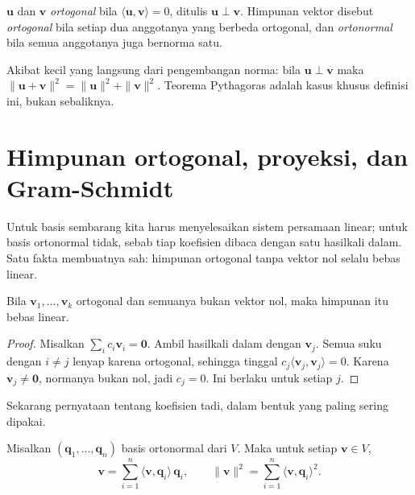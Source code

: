 
\begin{definisi}
$\mathbf{u}$ dan $\mathbf{v}$ \emph{ortogonal} bila
$\langle\mathbf{u},\mathbf{v}\rangle=0$, ditulis $\mathbf{u}\perp\mathbf{v}$. Himpunan
vektor disebut \emph{ortogonal} bila setiap dua anggotanya yang berbeda ortogonal, dan
\emph{ortonormal} bila semua anggotanya juga bernorma satu.
\end{definisi}

Akibat kecil yang langsung dari pengembangan norma: bila $\mathbf{u}\perp\mathbf{v}$
maka $\|\mathbf{u}+\mathbf{v}\|^{2}=\|\mathbf{u}\|^{2}+\|\mathbf{v}\|^{2}$. Teorema
Pythagoras adalah kasus khusus definisi ini, bukan sebaliknya.

\section{Himpunan ortogonal, proyeksi, dan Gram-Schmidt}

Untuk basis sembarang kita harus menyelesaikan sistem persamaan linear; untuk basis
ortonormal tidak, sebab tiap koefisien dibaca dengan satu hasilkali dalam. Satu fakta
membuatnya sah: himpunan ortogonal tanpa vektor nol selalu bebas linear.

\begin{lemma}
Bila $\mathbf{v}_{1},\dots,\mathbf{v}_{k}$ ortogonal dan semuanya bukan vektor nol,
maka himpunan itu bebas linear.
\end{lemma}

\begin{proof}
Misalkan $\sum_{i}c_{i}\mathbf{v}_{i}=\mathbf{0}$. Ambil hasilkali dalam dengan
$\mathbf{v}_{j}$. Semua suku dengan $i\ne j$ lenyap karena ortogonal, sehingga tinggal
$c_{j}\langle\mathbf{v}_{j},\mathbf{v}_{j}\rangle=0$. Karena $\mathbf{v}_{j}\ne\mathbf{0}$,
normanya bukan nol, jadi $c_{j}=0$. Ini berlaku untuk setiap $j$.
\end{proof}

Sekarang pernyataan tentang koefisien tadi, dalam bentuk yang paling sering dipakai.

\begin{proposisi}
Misalkan $(\mathbf{q}_{1},\dots,\mathbf{q}_{n})$ basis ortonormal dari $V$. Maka untuk
setiap $\mathbf{v}\in V$,
\[
  \mathbf{v}=\sum_{i=1}^{n}\langle\mathbf{v},\mathbf{q}_{i}\rangle\,\mathbf{q}_{i},
  \qquad
  \|\mathbf{v}\|^{2}=\sum_{i=1}^{n}\langle\mathbf{v},\mathbf{q}_{i}\rangle^{2}.
\]
\end{proposisi}

